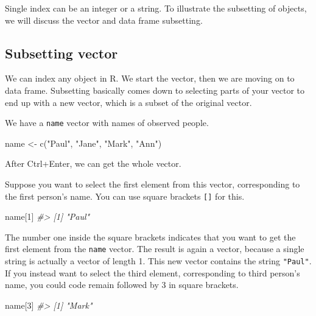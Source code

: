 \documentclass[
]{book}
\newenvironment{Shaded}{\begin{snugshade}}{\end{snugshade}}
\newcommand{\CommentTok}[1]{\textcolor[rgb]{0.56,0.35,0.01}{\textit{#1}}}
\newcommand{\DecValTok}[1]{\textcolor[rgb]{0.00,0.00,0.81}{#1}}
\newcommand{\FunctionTok}[1]{\textcolor[rgb]{0.00,0.00,0.00}{#1}}
\newcommand{\NormalTok}[1]{#1}
\newcommand{\OtherTok}[1]{\textcolor[rgb]{0.56,0.35,0.01}{#1}}
\newcommand{\StringTok}[1]{\textcolor[rgb]{0.31,0.60,0.02}{#1}}
\begin{document}
Single index can be an integer or a string. To illustrate the subsetting of objects, we will discuss the vector and data frame subsetting.

\hypertarget{subsetting-vector}{%
\subsection{Subsetting vector}\label{subsetting-vector}}

We can index any object in R. We start the vector, then we are moving on to data frame. Subsetting basically comes down to selecting parts of your vector to end up with a new vector, which is a subset of the original vector.

We have a \texttt{name} vector with names of observed people.

\begin{Shaded}
\begin{Highlighting}[]
\NormalTok{name }\OtherTok{\textless{}{-}} \FunctionTok{c}\NormalTok{(}\StringTok{"Paul"}\NormalTok{, }\StringTok{"Jane"}\NormalTok{, }\StringTok{"Mark"}\NormalTok{, }\StringTok{"Ann"}\NormalTok{)}
\end{Highlighting}
\end{Shaded}

After Ctrl+Enter, we can get the whole vector.

Suppose you want to select the first element from this vector, corresponding to the first person's name. You can use square brackets \texttt{{[}{]}} for this.

\begin{Shaded}
\begin{Highlighting}[]
\NormalTok{name[}\DecValTok{1}\NormalTok{]}
\CommentTok{\#\textgreater{} [1] "Paul"}
\end{Highlighting}
\end{Shaded}

The number one inside the square brackets indicates that you want to get the first element from the \texttt{name} vector. The result is again a vector, because a single string is actually a vector of length 1. This new vector contains the string \texttt{"Paul"}. If you instead want to select the third element, corresponding to third person's name, you could code remain followed by 3 in square brackets.

\begin{Shaded}
\begin{Highlighting}[]
\NormalTok{name[}\DecValTok{3}\NormalTok{]}
\CommentTok{\#\textgreater{} [1] "Mark"}
\end{Highlighting}
\end{Shaded}
\end{document}

